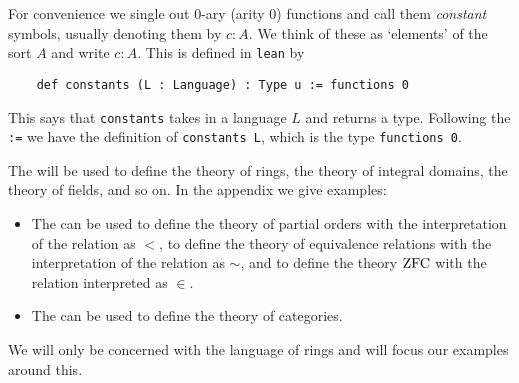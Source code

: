 \begin{dfn}[Language]
  For convenience we single out $0$-ary (arity $0$) functions and
  call them \textit{constant} symbols, usually denoting them by $c : A$.
  We think of these as `elements' of the sort $A$ and write $c : A$.
  This is defined in \texttt{lean} by

  \begin{lstlisting}
    def constants (L : Language) : Type u := functions 0\end{lstlisting}

  This says that \texttt{constants} takes in a language $L$ and returns a type.
  Following the \texttt{:=} we have the definition of \texttt{constants L},
  which is the type \texttt{functions 0}.
\end{dfn}

\begin{eg}
  The 
  will be used to define the theory of rings,
  the theory of integral domains, the theory of fields, and so on.
  In the appendix we give examples:
  \begin{itemize}
    \item The 
          can be used to define the theory of partial orders
          with the interpretation of the relation as $<$,
          to define the theory of equivalence relations with the
          interpretation of the relation as $\sim$,
          and to define the theory $\operatorname{ZFC}$ with the relation interpreted as $\in$.
    \item The 
          can be used to define the theory of categories.
  \end{itemize}
  We will only be concerned with the language of rings and will
  focus our examples around this.
\end{eg}

